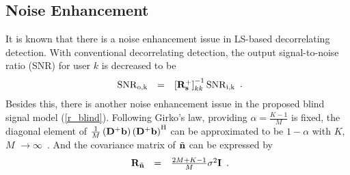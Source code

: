 \documentclass[a4paper,10pt,fleqn, twocolumn]{IEEETran}
\newcommand{\bb}{{\bf b}}
\newcommand{\bs}{{\bf s}}
\newcommand{\bn}{{\bf n}}
\newcommand{\bD}{{\bf D}}
\newcommand{\bI}{{\bf I}}
\newcommand{\bR}{{\bf R}}
\begin{document}
\subsection{Noise Enhancement} It is known that there is a noise
enhancement issue in LS-based decorrelating detection. With
conventional decorrelating detection, the output signal-to-noise
ratio (SNR) for user $k$ is decreased to be
\begin{equation}
\begin{array}{rcl}
{\rm SNR}_{\rm o,k}&=&\left[\bR_{\bs}^{+}\right]_{kk}^{-1}{\rm
SNR}_{\rm i,k}
\end{array}.\label{SNR_DD}
\end{equation}
\noindent Besides this, there is another noise enhancement issue
in the proposed blind signal model (\ref{r_blind}). Following
Girko's law, providing $\alpha=\frac{K-1}{M}$ is fixed, the
diagonal element of
$\frac{1}{M}\left(\bD^{+}\bb\right)\left(\bD^{+}\bb\right)^{\rm
H}$ can be approximated to be $1-\alpha$ with $K$, $M$
$\rightarrow\infty$~\cite{Muller}. And the covariance matrix of
$\tilde\bn$ can be expressed by
\begin{equation}
\begin{array}{rcl}
\bR_{\tilde\bn}&=&\frac{2M+K-1}{M}\sigma^{2}\bI
\end{array}.\label{noise_var_new}
\end{equation}
\end{document}
